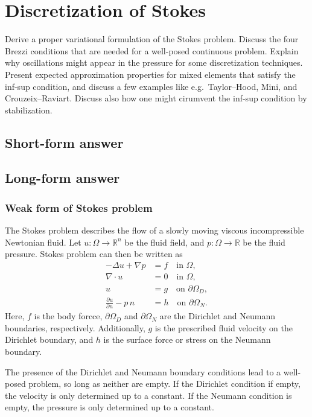 \section{Discretization of Stokes}
Derive a proper variational formulation of the Stokes problem.
Discuss the four Brezzi conditions that are needed for a well-posed continuous problem.
Explain why oscillations might appear in the pressure for some discretization techniques.
Present expected approximation properties for mixed elements that satisfy the inf-sup condition, and discuss a few examples like e.g.\ Taylor--Hood, Mini, and Crouzeix--Raviart. %
Discuss also how one might cirumvent the inf-sup condition by stabilization.

\subsection{Short-form answer}


\newpage
\subsection{Long-form answer}
\subsubsection{Weak form of Stokes problem}
The Stokes problem describes the flow of a slowly moving viscous incompressible Newtonian fluid.
Let $u : \Omega \to \mathbb{R}^n$ be the fluid field, and $p: \Omega \to \mathbb{R}$ be the fluid pressure.
Stokes problem can then be written as
\begin{equation}
    \begin{split}
        -\Delta u + \nabla p &= f \quad \text{in } \Omega, \\
        \nabla \cdot u &= 0 \quad \text{in } \Omega, \\
        u &= g \quad \text{on } \partial\Omega_D, \\
        \frac{\partial u}{\partial n} - p \, n &= h \quad \text{on } \partial\Omega_N.
    \end{split}
\end{equation}
Here, $f$ is the body forcce, $\partial\Omega_D$ and $\partial\Omega_N$ are the Dirichlet and Neumann boundaries, respectively.
Additionally, $g$ is the prescribed fluid velocity on the Dirichlet boundary, and $h$ is the surface force or stress on the Neumann boundary.

The presence of the Dirichlet and Neumann boundary conditions lead to a well-posed problem, so long as neither are empty.
If the Dirichlet condition if empty, the velocity is only determined up to a constant.
If the Neumann condition is empty, the pressure is only determined up to a constant.

